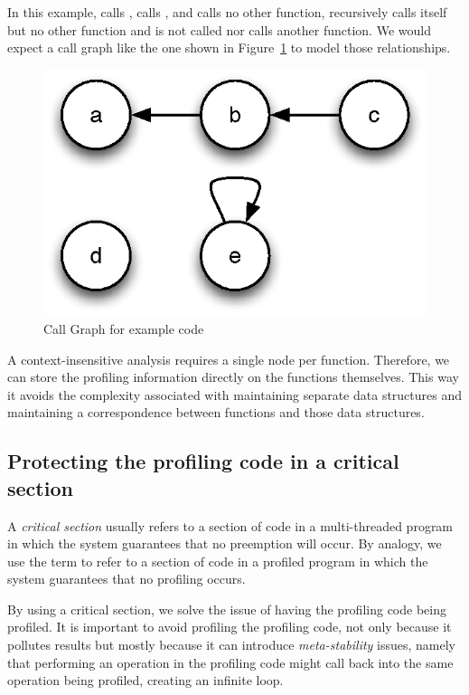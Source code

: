
In this example,  calls ,  calls , and  calls no
other function,  recursively calls itself but no other function and
 is not called nor calls another function. We would expect a call graph
like the one shown in Figure~\ref{fig:CallGraph} to model those relationships.

\begin{figure}[htb]
\begin{center}
\includegraphics{figures/callgraph}
\caption{\label{fig:CallGraph} Call Graph for example code}
\end{center}
\end{figure}

A context-insensitive analysis requires a single node per function. Therefore,
we can store the profiling information directly on the functions themselves.
This way it avoids the complexity associated with maintaining separate data
structures and maintaining a correspondence between functions and those data
structures.

\subsection{Protecting the profiling code in a critical section} 

A \textit{critical section} usually refers to a section of code in a
multi-threaded program in which the system guarantees that no preemption will
occur. By analogy, we use the term to refer to a section of code in a profiled
program in which the system guarantees that no profiling occurs.

By using a critical section, we solve the issue of having the profiling code
being profiled. It is important to avoid profiling the profiling code, not only
because it pollutes results but mostly because it can introduce
\textit{meta-stability} issues, namely that performing an operation in the
profiling code might call back into the same operation being profiled, creating
an infinite loop.

